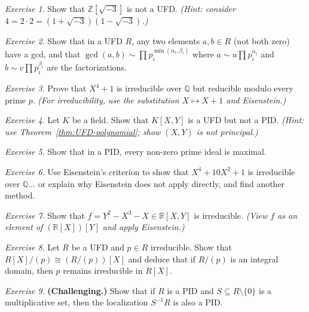 \documentclass[12pt,a4paper,openany]{book}
\theoremstyle{definition}
\theoremstyle{remark}
\newtheorem{exercise}{Exercise}[chapter]
\renewcommand{\gcd}{\operatorname{gcd}}
\begin{document}
\begin{exercise}\label{exo:pid-4}
Show that $\mathbb{Z}[\sqrt{-3}]$ is not a UFD. \textit{(Hint: consider $4=2\cdot 2=(1+\sqrt{-3})(1-\sqrt{-3})$.)}
\end{exercise}

\begin{exercise}\label{exo:pid-5}
Show that in a UFD $R$, any two elements $a,b\in R$ (not both zero) have a gcd, and that $\gcd(a,b)\sim\prod p_i^{\min(\alpha_i,\beta_i)}$ where $a\sim u\prod p_i^{\alpha_i}$ and $b\sim v\prod p_i^{\beta_i}$ are the factorizations.
\end{exercise}

\begin{exercise}\label{exo:pid-6}
Prove that $X^4+1$ is irreducible over $\mathbb{Q}$ but reducible modulo every prime $p$. \textit{(For irreducibility, use the substitution $X\mapsto X+1$ and Eisenstein.)}
\end{exercise}

\begin{exercise}\label{exo:pid-7}
Let $K$ be a field. Show that $K[X,Y]$ is a UFD but not a PID. \textit{(Hint: use Theorem~\ref{thm:UFD-polynomial}; show $(X,Y)$ is not principal.)}
\end{exercise}

\begin{exercise}\label{exo:pid-8}
Show that in a PID, every non-zero prime ideal is maximal.
\end{exercise}

\begin{exercise}\label{exo:pid-9}
Use Eisenstein's criterion to show that $X^4+10X^2+1$ is irreducible over $\mathbb{Q}$... or explain why Eisenstein does not apply directly, and find another method.
\end{exercise}

\begin{exercise}\label{exo:pid-10}
Show that $f=Y^2-X^3-X\in\mathbb{R}[X,Y]$ is irreducible. \textit{(View $f$ as an element of $(\mathbb{R}[X])[Y]$ and apply Eisenstein.)}
\end{exercise}

\begin{exercise}\label{exo:pid-11}
Let $R$ be a UFD and $p\in R$ irreducible. Show that $R[X]/(p)\cong(R/(p))[X]$ and deduce that if $R/(p)$ is an integral domain, then $p$ remains irreducible in $R[X]$.
\end{exercise}

\begin{exercise}\label{exo:pid-12}
\textbf{(Challenging.)} Show that if $R$ is a PID and $S\subseteq R\setminus\{0\}$ is a multiplicative set, then the localization $S^{-1}R$ is also a PID.
\end{exercise}
\end{document}
